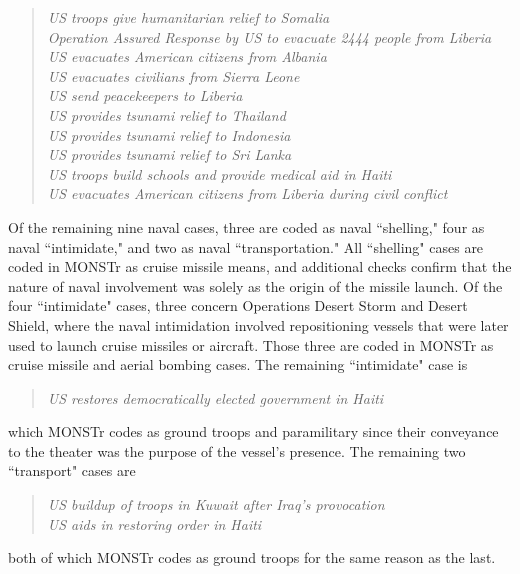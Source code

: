 \documentclass[fleqn,12pt]{article}
\begin{document}
\begin{quote}
    \textit{US troops give humanitarian relief to Somalia \\
    Operation Assured Response by US to evacuate 2444 people from Liberia \\
    US evacuates American citizens from Albania \\
    US evacuates civilians from Sierra Leone \\
    US send peacekeepers to Liberia \\
    US provides tsunami relief to Thailand \\
    US provides tsunami relief to Indonesia \\
    US provides tsunami relief to Sri Lanka \\
    US troops build schools and provide medical aid in Haiti \\
    US evacuates American citizens from Liberia during civil conflict}
\end{quote}

Of the remaining nine naval cases, three are coded as naval ``shelling," four as naval ``intimidate," and two as naval ``transportation." All ``shelling" cases are coded in MONSTr as cruise missile means, and additional checks confirm that the nature of naval involvement was solely as the origin of the missile launch. Of the four ``intimidate" cases, three concern Operations Desert Storm and Desert Shield, where the naval intimidation involved repositioning vessels that were later used to launch cruise missiles or aircraft. Those three are coded in MONSTr as cruise missile and aerial bombing cases. The remaining ``intimidate" case is 

\begin{quote}
    \textit{US restores democratically elected government in Haiti}
\end{quote}

\noindent
which MONSTr codes as ground troops and paramilitary since their conveyance to the theater was the purpose of the vessel's presence. The remaining two ``transport" cases are 

\begin{quote}
    \textit{US buildup of troops in Kuwait after Iraq's provocation \\
    US aids in restoring order in Haiti}
\end{quote}

\noindent
both of which MONSTr codes as ground troops for the same reason as the last.
\end{document}
